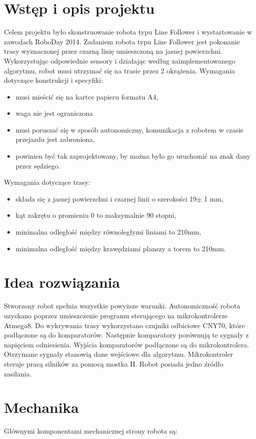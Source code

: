 \documentclass[11pt,a4paper]{article}
\begin{document}
\section{Wstęp i opis projektu}
Celem projektu było skonstruowanie robota typu Line Follower i wystartowanie w zawodach RoboDay 2014.
Zadaniem robota typu Line Follower jest pokonanie trasy wyznaczonej przez czarną linię umieszczoną na jasnej powierzchni. 
Wykorzystując odpowiednie sensory i działając według zaimplementowanego algorytmu, robot musi utrzymać się na trasie przez 2 okrążenia.
\newline Wymagania dotyczące konstrukcji i specyfiki:
\begin{itemize}
  \item musi mieścić się na kartce papieru formatu A4,
  \item waga nie jest ograniczona
  \item musi poruszać się w sposób autonomiczny, komunikacja z robotem w czasie przejazdu jest zabroniona,
  \item powinien być tak zaprojektowany, by można było go uruchomić na znak dany przez sędziego.
\end{itemize}
Wymagania dotyczące trasy:
\begin{itemize}
  \item składa się z jasnej powierzchni i czarnej linii o szerokości 19$\pm$ 1 mm,
  \item kąt zakrętu o promieniu 0 to maksymalnie 90 stopni,
  \item minimalna odległość między równoległymi liniami to 210mm,
  \item minimalna odległość między krawędziami planszy a torem to 210mm.
\end{itemize}
\section{Idea rozwiązania}
Stworzony robot spełnia wszystkie powyższe warunki.
Autonomiczność robota uzyskano poprzez umieszczenie programu sterującego na mikrokontrolerze Atmega8. 
Do wykrywania trasy wykorzystano czujniki odbiciowe CNY70, które podłączone są do komparatorów.
Następnie komparatory porównują te sygnały z napięciem odniesienia. Wyjścia komparatorów podłączone są do mikrokontrolera.
Otrzymane sygnały stanowią dane wejściowe dla algorytmu.
Mikrokontroler steruje pracą silników za pomocą mostka H. Robot posiada jedno źródło zasilania.

\section{Mechanika}
  Głównymi komponentami mechanicznej strony robota są:
\end{document}
